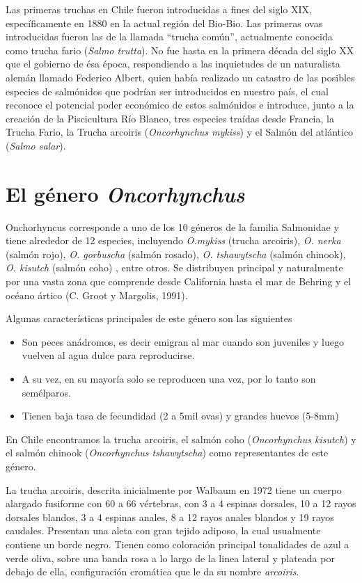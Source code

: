 \documentclass[12pt,letterpaper,oneside]{scrbook}
\begin{document}
Las primeras truchas en Chile fueron introducidas a fines del siglo XIX,
específicamente en 1880 en la actual región del Bio-Bio. Las primeras
ovas introducidas fueron las de la llamada ``trucha común'', actualmente
conocida como trucha fario (\emph{Salmo trutta}). No fue hasta en la
primera década del siglo XX que el gobierno de ésa época, respondiendo a
las inquietudes de un naturalista alemán llamado Federico Albert, quien
había realizado un catastro de las posibles especies de salmónidos que
podrían ser introducidos en nuestro país, el cual reconoce el potencial
poder económico de estos salmónidos e introduce, junto a la creación de
la Piscicultura Río Blanco, tres especies traídas desde Francia, la
Trucha Fario, la Trucha arcoiris (\emph{Oncorhynchus mykiss}) y el
Salmón del atlántico (\emph{Salmo salar}).

\section{El género \emph{Oncorhynchus}}

Onchorhyncus corresponde a uno de los 10 géneros de la familia
Salmonidae y tiene alrededor de 12 especies, incluyendo \emph{O.mykiss}
(trucha arcoiris), \emph{O. nerka} (salmón rojo), \emph{O. gorbuscha}
(salmón rosado), \emph{O. tshawytscha} (salmón chinook),
\emph{O. kisutch} (salmón coho) , entre otros. Se distribuyen principal
y naturalmente por una vasta zona que comprende desde California hasta
el mar de Behring y el océano ártico (C. Groot y Margolis, 1991).

Algunas características principales de este género son las siguientes

\begin{itemize}
    \item Son peces anádromos, es decir emigran al mar cuando son juveniles y luego vuelven al agua dulce para reproducirse.
    \item A su vez, en su mayoría solo se reproducen una vez, por lo tanto son semélparos.
    \item Tienen baja tasa de fecundidad (2 a 5mil ovas) y grandes huevos (5-8mm)
\end{itemize}

En Chile encontramos la trucha arcoiris, el salmón coho
(\emph{Oncorhynchus kisutch}) y el salmón chinook
(\emph{Oncorhynchus tshawytscha}) como representantes de este género.

La trucha arcoiris, descrita inicialmente por Walbaum en 1972 tiene un
cuerpo alargado fusiforme con 60 a 66 vértebras, con 3 a 4 espinas
dorsales, 10 a 12 rayos dorsales blandos, 3 a 4 espinas anales, 8 a 12
rayos anales blandos y 19 rayos caudales. Presentan una aleta con gran
tejido adiposo, la cual usualmente contiene un borde negro. Tienen como
coloración principal tonalidades de azul a verde oliva, sobre una banda
rosa a lo largo de la linea lateral y plateada por debajo de ella,
configuración cromática que le da su nombre \emph{arcoiris}.
\end{document}
